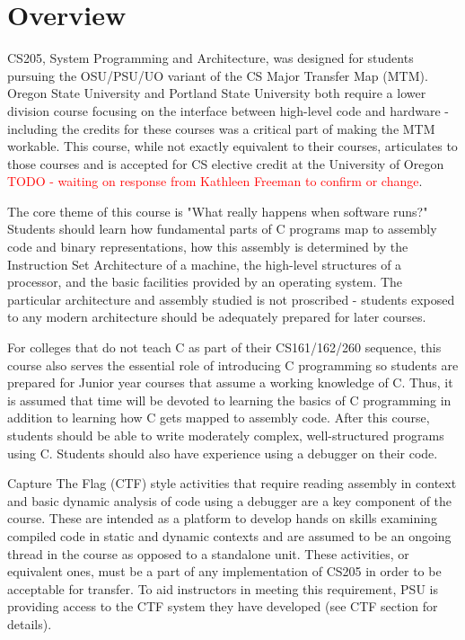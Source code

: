 \documentclass[12pt,letterpaper]{article}
\begin{document}
	\section*{Overview}

	CS205, System Programming and Architecture, was designed for students pursuing the OSU/PSU/UO variant of the CS Major Transfer Map (MTM). Oregon State University and Portland State University both require a lower division course focusing on the interface between high-level code and hardware - including the credits for these courses was a critical part of making the MTM workable. This course, while not exactly equivalent to their courses, articulates to those courses and is accepted for CS elective credit at the University of Oregon \textcolor{red}{TODO - waiting on response from Kathleen Freeman to confirm or change}.
	 
	The core theme of this course is "What really happens when software runs?" Students should learn how fundamental parts of C programs map to assembly code and binary representations, how this assembly is determined by the Instruction Set Architecture of a machine, the high-level structures of a processor, and the basic facilities provided by an operating system. The particular architecture and assembly studied is not proscribed - students exposed to any modern architecture should be adequately prepared for later courses.

	For colleges that do not teach C as part of their CS161/162/260 sequence, this course also serves the essential role of introducing C programming so students are prepared for Junior year courses that assume a working knowledge of C. Thus, it is assumed that time will be devoted to learning the basics of C programming in addition to learning how C gets mapped to assembly code. After this course, students should be able to write moderately complex, well-structured programs using C. Students should also have experience using a debugger on their code.
	
	Capture The Flag (CTF) style activities that require reading assembly in context and basic dynamic analysis of code using a debugger are a key component of the course. These are intended as a platform to develop hands on skills examining compiled code in static and dynamic contexts and are assumed to be an ongoing thread in the course as opposed to a standalone unit. These activities, or equivalent ones, must be a part of any implementation of CS205 in order to be acceptable for transfer. To aid instructors in meeting this requirement, PSU is providing access to the CTF system they have developed (see CTF section for details). 
	
\end{document}
